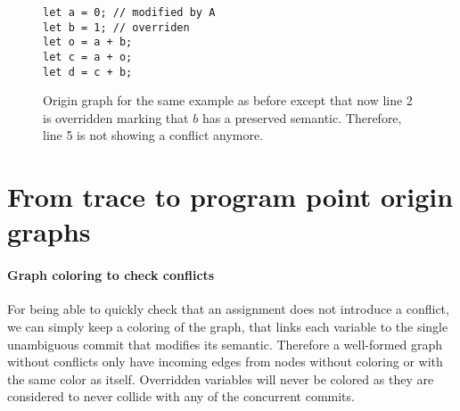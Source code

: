 \documentclass[a4paper,10pt]{article}
\begin{document}
\begin{figure}[ht]
\begin{minipage}{.5\textwidth}
\begin{lstlisting}
let a = 0; // modified by A
let b = 1; // overriden
let o = a + b;
let c = a + o;
let d = c + b;
\end{lstlisting}
\end{minipage}\hfill
\begin{minipage}{.45\textwidth}
\centering{}
\end{minipage}
\caption{Origin graph for the same example as before except that now line 2 is
overridden marking that $b$ has a preserved semantic. Therefore, line 5 is not showing a conflict anymore.}
\end{figure}

\section{From trace to program point origin graphs}
\paragraph{Graph coloring to check conflicts} For being able to quickly check that an assignment does not introduce a conflict, we can simply keep a coloring of the graph, that links each variable to the single unambiguous commit that modifies its semantic.
Therefore a well-formed graph without conflicts only have incoming edges from nodes without coloring or with the same color as itself.
Overridden variables will never be colored as they are considered to never collide with any of the concurrent commits.
\end{document}
